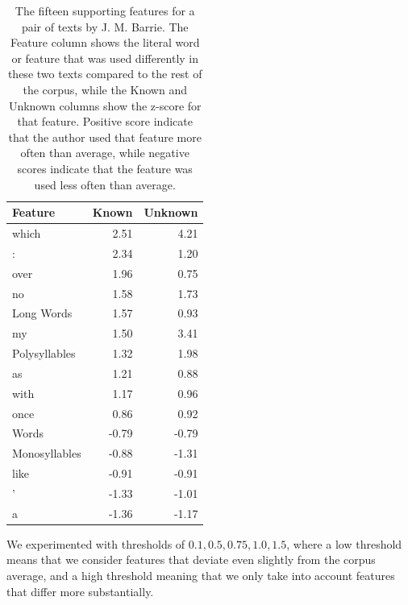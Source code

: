 \begin{table}[ht]
\begin{center}
\begin{tabular}{lrr}
\toprule
\bf Feature & \bf Known & \bf Unknown \\
\midrule
which         & 2.51  & 4.21  \\  
:             & 2.34  & 1.20   \\
over          & 1.96  & 0.75  \\
no            & 1.58  & 1.73  \\ 
Long Words    & 1.57  & 0.93  \\   
my            & 1.50  & 3.41  \\      
Polysyllables & 1.32  & 1.98  \\    
as            & 1.21  & 0.88  \\       
with          & 1.17  & 0.96  \\       
once          & 0.86  & 0.92  \\         
Words         &-0.79  & -0.79 \\        
Monosyllables &-0.88  & -1.31 \\           
like          &-0.91  & -0.91 \\           
'             &-1.33  & -1.01 \\          
a             &-1.36  & -1.17 \\         

\bottomrule
\end{tabular}
\end{center}
\caption{\label{tab:barrie}The fifteen supporting features for a pair of texts by J. M. Barrie. The Feature column shows the literal word or feature that was used differently in these two texts compared to the rest of the corpus, while the Known and Unknown columns show the z-score for that feature. Positive score indicate that the author used that feature more often than average, while negative scores indicate that the feature was used less often than average.}
\end{table}

We experimented with thresholds of ${0.1, 0.5, 0.75, 1.0, 1.5}$, where a low threshold means that we consider features that deviate even slightly from the corpus average, and a high threshold meaning that we only take into account features that differ more substantially. 

